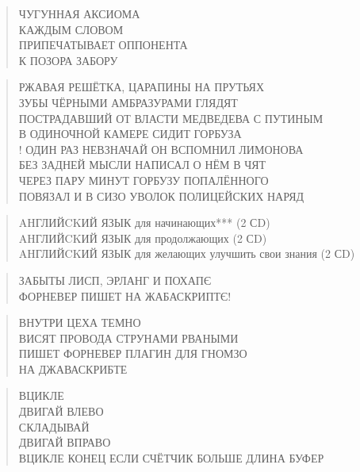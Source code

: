 \poemtitle{***}
\begin{verse}
ЧУГУННАЯ АКСИОМА\\
КАЖДЫМ СЛОВОМ\\
ПРИПЕЧАТЫВАЕТ ОППОНЕНТА\\
К ПОЗОРА ЗАБОРУ
\end{verse}

\poemtitle{***}
\begin{verse}
РЖАВАЯ РЕШЁТКА, ЦАРАПИНЫ НА ПРУТЬЯХ\\
ЗУБЫ ЧЁРНЫМИ АМБРАЗУРАМИ ГЛЯДЯТ\\
ПОСТРАДАВШИЙ ОТ ВЛАСТИ МЕДВЕДЕВА С ПУТИНЫМ\\
В ОДИНОЧНОЙ КАМЕРЕ СИДИТ ГОРБУЗА\\!
ОДИН РАЗ НЕВЗНАЧАЙ ОН ВСПОМНИЛ ЛИМОНОВА\\
БЕЗ ЗАДНЕЙ МЫСЛИ НАПИСАЛ О НЁМ В ЧЯТ\\
ЧЕРЕЗ ПАРУ МИНУТ ГОРБУЗУ ПОПАЛЁННОГО\\
ПОВЯЗАЛ И В СИЗО УВОЛОК ПОЛИЦЕЙСКИХ НАРЯД
\end{verse}

\poemtitle{***}
\begin{verse}
AHГЛИЙCKИЙ ЯЗЫК для начинающих*** (2 СD)\\
AHГЛИЙCKИЙ ЯЗЫК для продолжающих (2 СD)\\
AHГЛИЙCKИЙ ЯЗЫК для желающих улучшить свои знания (2 СD)
\end{verse}

\poemtitle{***}
\begin{verse}
ЗАБЫТЫ ЛИСП, ЭРЛАНГ И ПОХАПЄ \\
ФОРНЕВЕР ПИШЕТ НА ЖАБАСКРИПТЄ!
\end{verse}

\poemtitle{***}
\begin{verse}
ВНУТРИ ЦЕХА ТЕМНО\\
ВИСЯТ ПРОВОДА СТРУНАМИ РВАНЫМИ\\
ПИШЕТ ФОРНЕВЕР ПЛАГИН ДЛЯ ГНОМЗО\\
НА ДЖАВАСКРИБТЕ
\end{verse}

\poemtitle{***}
\begin{verse}
ВЦИКЛЕ\\
ДВИГАЙ ВЛЕВО\\
СКЛАДЫВАЙ\\
ДВИГАЙ ВПРАВО\\
ВЦИКЛЕ КОНЕЦ ЕСЛИ СЧЁТЧИК БОЛЬШЕ ДЛИНА БУФЕР
\end{verse}

